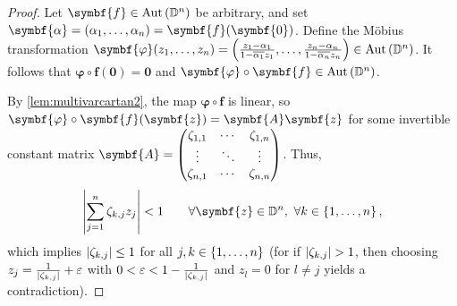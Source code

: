 \begin{proof}
    Let \(\symbf{f}\in\Aut\qty(\mathbb{D}^n)\) be arbitrary, and set \(\symbf{\alpha}=\qty(\alpha_1,\ldots,\alpha_n)=\symbf{f}(\symbf{0})\). Define the Möbius transformation \(\symbf{\varphi}\qty(z_1,\ldots,z_n)=\qty(\frac{z_1-\alpha_1}{1-\overline{\alpha_1}z_1},\ldots,\frac{z_n-\alpha_n}{1-\overline{\alpha_n}z_n})\in\Aut\qty(\mathbb{D}^n)\). It follows that \(\symbf{\varphi}\circ\symbf{f}(\symbf{0})=\symbf{0}\) and \(\symbf{\varphi}\circ\symbf{f}\in\Aut\qty(\mathbb{D}^n)\).

    By \cref{lem:multivarcartan2}, the map \(\symbf{\varphi}\circ\symbf{f}\) is linear, so \(\symbf{\varphi}\circ\symbf{f}\qty(\symbf{z})=\symbf{A}\symbf{z}\) for some invertible constant matrix \(\symbf{A}=\mqty(\zeta_{1,1}&\cdots&\zeta_{1,n}\\\vdots&\ddots&\vdots\\\zeta_{n,1}&\cdots&\zeta_{n,n})\). Thus,
    \[\abs{\sum_{j=1}^n\zeta_{k,j}z_j}<1\qquad\forall\symbf{z}\in\mathbb{D}^n,\ \forall k\in\cbraces{1,\ldots,n},\]
    which implies \(\abs{\zeta_{k,j}}\leq1\) for all \(j,k\in\cbraces{1,\ldots,n}\) (for if \(\abs{\zeta_{k,j}}>1\), then choosing \(z_j=\frac1{\abs{\zeta_{k,j}}}+\varepsilon\) with \(0<\varepsilon<1-\frac1{\abs{\zeta_{k,j}}}\) and \(z_l=0\) for \(l\neq j\) yields a contradiction).


\end{proof}
